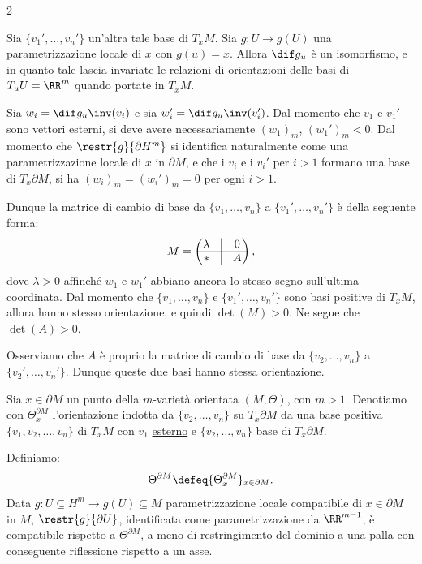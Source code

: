 \begin{multicols*}{2}
\begin{remark}
        Sia $\{v_1', \ldots, v_n'\}$ un'altra tale base di $T_x M$.
        Sia $g : U \to g(U)$ una parametrizzazione locale di $x$ con
        $g(u) = x$. Allora $\dif g_u$ è un isomorfismo, e in quanto tale
        lascia invariate le relazioni di orientazioni delle basi di $T_u U = \RR^m$
        quando portate in $T_x M$. \smallskip

        Sia $w_i = \dif g_u\inv(v_i)$ e sia $w_i' = \dif g_u\inv(v_i')$. Dal momento
        che $v_1$ e $v_1'$ sono vettori esterni, si deve avere necessariamente
        $(w_1)_m$, $(w_1')_m < 0$. Dal momento che $\restr{g}{\partial H^m}$ si identifica
        naturalmente come una parametrizzazione locale di $x$ in $\partial M$, e che i $v_i$ e i $v_i'$ per $i > 1$ formano
        una base di $T_x \partial M$, si ha $(w_i)_m = (w_i')_m = 0$ per ogni $i > 1$. \smallskip

        Dunque la matrice di cambio di base da $\{v_1, \ldots, v_n\}$ a
        $\{v_1', \ldots, v_n'\}$ è della seguente forma:
        \[
            M = \begin{pmatrix}
                \lambda & \vline & 0 \\
                \hline
                *       & \vline & A
            \end{pmatrix},
        \]
        dove $\lambda > 0$ affinché $w_1$ e $w_1'$ abbiano ancora lo stesso segno
        sull'ultima coordinata. Dal momento che $\{v_1, \ldots, v_n\}$ e
        $\{v_1', \ldots, v_n'\}$ sono basi positive di $T_x M$, allora hanno
        stesso orientazione, e quindi $\det(M) > 0$. Ne segue che $\det(A) > 0$. \smallskip

        Osserviamo che $A$ è proprio la matrice di cambio di base da $\{v_2, \ldots, v_n\}$ a
        $\{v_2', \ldots, v_n'\}$. Dunque queste due basi hanno stessa orientazione.
    \end{remark}

    \begin{remark}
        Sia $x \in \partial M$ un punto della $m$-varietà orientata $(M, \Theta)$, con $m > 1$.
        Denotiamo con $\Theta_x^{\partial M}$ l'orientazione indotta da $\{v_2, \ldots, v_n\}$
        su $T_x \partial M$ da una base positiva $\{v_1, v_2, \ldots, v_n\}$ di $T_x M$
        con $v_1$ \underline{esterno} e $\{v_2, \ldots, v_n\}$ base di $T_x \partial M$. \smallskip

        Definiamo:
        \[ \Theta^{\partial M} \defeq \{ \Theta_x^{\partial M} \}_{x \in \partial M}. \]
        Data $g : U \subseteq H^m \to g(U) \subseteq M$ parametrizzazione locale
        compatibile di
        $x \in \partial M$ in $M$, $\restr{g}{\partial U}$, identificata come parametrizzazione da $\RR^{m-1}$,
        è compatibile rispetto a $\Theta^{\partial M}$, a meno di restringimento del dominio a una palla
        con conseguente riflessione rispetto a un asse. \smallskip


\end{remark}
\end{multicols*}
